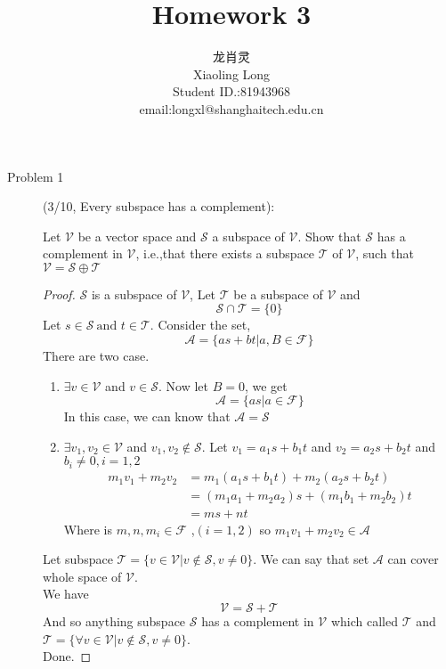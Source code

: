 \documentclass[a4paper]{article}
\title{Homework 3}
\author{龙肖灵 \\Xiaoling Long\\Student ID.:81943968\\email:longxl@shanghaitech.edu.cn}
\begin{document}
\maketitle

\begin{description}
 \item[Problem 1](3/10, Every subspace has a complement):{

       Let $\mathcal{V}$ be a vector space and $\mathcal{S}$ a subspace of $\mathcal{V}$. Show that $\mathcal{S}$ has
       a complement in $\mathcal{V}$, i.e.,that there exists a subspace $\mathcal{T}$ of $\mathcal{V}$,
       such that $\mathcal{V}=\mathcal{S}\oplus \mathcal{T}$}
 \begin{proof}
  $\mathcal{S}$ is a subspace of $\mathcal{V}$, Let $\mathcal{T}$ be a subspace of $\mathcal{V}$ and $$\mathcal{S} \cap
  \mathcal{T} =\{0\} $$
  Let $s \in \mathcal{S} \ \text{and } t \in \mathcal{T}$. Consider the set,$$\mathcal{A}=\{as+bt | a,B \in \mathcal{F}\}$$
  There are two case.
  \begin{enumerate}
   \item $\exists v \in \mathcal{V}$ and $v \in \mathcal{S}$. Now let $B=0$, we get $$\mathcal{A}=\{as | a \in \mathcal{F}\}$$
         In this case, we can know that $\mathcal{A}=\mathcal{S}$
   \item $\exists v_{1},v_{2} \in \mathcal{V}$ and $v_{1},v_{2} \notin \mathcal{S}$. Let $v_{1}=a_{1}s+b_{1}t$
         and $v_{2}=a_{2}s+b_{2}t$ and $b_{i}\ne 0,i=1,2$
         \begin{align*}
          m_{1}v_{1}+m_{2}v_{2} & =m_{1}(a_{1}s+b_{1}t)+m_{2}(a_{2}s+b_{2}t)         \\
                                & =(m_{1}a_{1}+m_{2}a_{2})s+(m_{1}b_{1}+m_{2}b_{2})t \\
                                & =ms+nt
         \end{align*}
         Where is $m,n,m_{i} \in \mathcal{F}$ ,$(i=1,2)$ so $m_{1}v_{1}+m_{2}v_{2}\in \mathcal{A}$
  \end{enumerate}
  Let subspace $\mathcal{T}=\{v\in \mathcal{V}| v\notin \mathcal{S},v\ne 0\}$. We can say that set $\mathcal{A}$ can cover
  whole space of $\mathcal{V}$.\\
  We have $$\mathcal{V}=\mathcal{S}+\mathcal{T}$$
  And so anything subspace $\mathcal{S}$ has a complement in $\mathcal{V}$ which called $\mathcal{T}$ and
  $\mathcal{T}=\{\forall v \in \mathcal{V} | v \notin \mathcal{S},v\ne 0 \}$.\\
  Done.


\end{proof}
\end{description}
\end{document}

